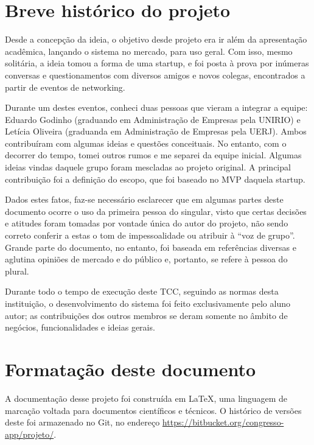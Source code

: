 \documentclass[12pt,a4paper,twoside,hyphens,english,brazil]{abntex2}
\begin{document}
\section*{Breve histórico do projeto}
Desde a concepção da ideia, o objetivo desde projeto era ir além da apresentação acadêmica, lançando o sistema no mercado, para uso geral. Com isso, mesmo solitária, a ideia tomou a forma de uma startup, e foi posta à prova por inúmeras conversas e questionamentos com diversos amigos e novos colegas, encontrados a partir de eventos de networking.

Durante um destes eventos, conheci duas pessoas que vieram a integrar a equipe: Eduardo Godinho (graduando em Administração de Empresas pela UNIRIO) e Letícia Oliveira (graduanda em Administração de Empresas pela UERJ). Ambos contribuíram com algumas ideias e questões conceituais. No entanto, com o decorrer do tempo, tomei outros rumos e me separei da equipe inicial. Algumas ideias vindas daquele grupo foram mescladas ao projeto original. A principal contribuição foi a definição do escopo, que foi baseado no MVP\footnotemark{} daquela startup.

Dados estes fatos, faz-se necessário esclarecer que em algumas partes deste documento ocorre o uso da primeira pessoa do singular, visto que certas decisões e atitudes foram tomadas por vontade única do autor do projeto, não sendo correto conferir a estas o tom de impessoalidade ou atribuir à ``voz de grupo''. Grande parte do documento, no entanto, foi baseada em referências diversas e aglutina opiniões de mercado e do público e, portanto, se refere à pessoa do plural.


Durante todo o tempo de execução deste TCC, seguindo as normas desta instituição, o desenvolvimento do sistema foi feito exclusivamente pelo aluno autor; as contribuições dos outros membros se deram somente no âmbito de negócios, funcionalidades e ideias gerais.

\section*{Formatação deste documento}
A documentação desse projeto foi construída em \LaTeX, uma linguagem de marcação voltada para documentos científicos e técnicos. O histórico de versões deste foi armazenado no Git, no endereço \url{https://bitbucket.org/congresso-app/projeto/}.
\end{document}

